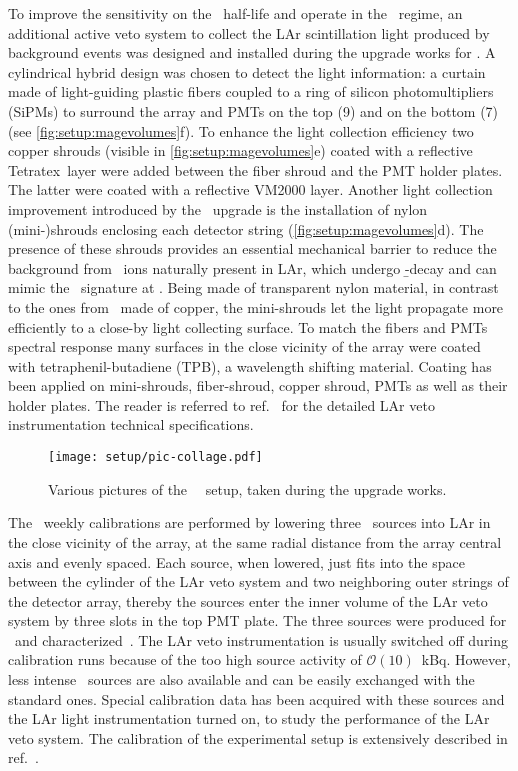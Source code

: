 To improve the sensitivity on the \onbb\ half-life and operate in the \bkgfree\ regime, an
additional active veto system to collect the LAr scintillation light produced by
background events was designed and installed during the upgrade works for \phasetwo. A
cylindrical hybrid design was chosen to detect the light information: a curtain made of
light-guiding plastic fibers coupled to a ring of silicon photomultipliers (SiPMs) to
surround the array and PMTs on the top (9) and on the bottom (7) (see
\cref{fig:setup:magevolumes}f). To enhance the light collection efficiency two copper
shrouds (visible in \cref{fig:setup:magevolumes}e) coated with a reflective Tetratex\reg\
layer were added between the fiber shroud and the PMT holder plates. The latter were
coated with a reflective VM2000 layer. Another light collection improvement introduced by
the \phasetwo\ upgrade is the installation of nylon (mini-)shrouds enclosing each detector
string (\cref{fig:setup:magevolumes}d). The presence of these shrouds provides an
essential mechanical barrier to reduce the background from \kvz\ ions naturally present in
LAr, which undergo \b-decay and can mimic the \onbb\ signature at \qbb. Being made of
transparent nylon material, in contrast to the ones from \phaseone\ made of copper, the
mini-shrouds let the light propagate more efficiently to a close-by light collecting
surface. To match the fibers and PMTs spectral response many surfaces in the close vicinity
of the array were coated with tetraphenil-butadiene (TPB), a wavelength shifting material.
Coating has been applied on mini-shrouds, fiber-shroud, copper shroud, PMTs as well as
their holder plates. The reader is referred to ref.~\cite{Agostini2018a} for the detailed
LAr veto instrumentation technical specifications.

\begin{figure}
  \texttt{[image: setup/pic-collage.pdf]}
  \caption{%
    Various pictures of the \gerda\ \phasetwo\ setup, taken during the upgrade
    works.
  }\label{fig:setup:pictures}
\end{figure}

The \gerda\ weekly calibrations are performed by lowering three \Th\ sources into LAr in
the close vicinity of the array, at the same radial distance from the array central axis
and evenly spaced. Each source, when lowered, just fits into the space between the
cylinder of the LAr veto system and two neighboring outer strings of the detector array,
thereby the sources enter the inner volume of the LAr veto system by three slots in the
top PMT plate.  The three sources were produced for \phasetwo\ and
characterized~\cite{Baudis2015}. The LAr veto instrumentation is usually switched off
during calibration runs because of the too high source activity of $\mathcal{O}(10)$~kBq.
However, less intense \Ra\ sources are also available and can be easily exchanged with the
standard ones. Special calibration data has been acquired with these sources and the LAr
light instrumentation turned on, to study the performance of the LAr veto system. The
calibration of the experimental setup is extensively described in ref.~\fillme{[fillme]}.

